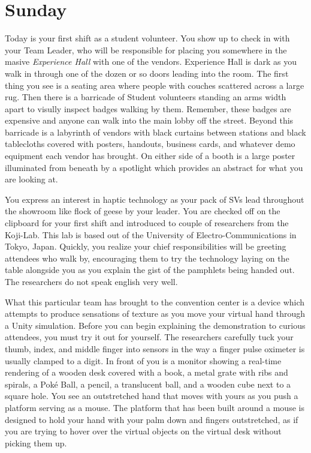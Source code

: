 \documentclass[../main.tex]{subfiles}
\begin{document}
\section{Sunday}

Today is your first shift as a student volunteer. You show up to check in with your Team Leader, who will be responsible for placing you somewhere in the masive \textit{Experience Hall} with one of the vendors. Experience Hall is dark as you walk in through one of the dozen or so doors leading into the room. The first thing you see is a seating area where people with couches scattered across a large rug. Then there is a barricade of Student volunteers standing an arms width apart to visully inspect badges walking by them. Remember, these badges are expensive and anyone can walk into the main lobby off the street. Beyond this barricade is a labyrinth of vendors with black curtains between stations and black tablecloths covered with posters, handouts, business cards, and whatever demo equipment each vendor has brought. On either side of a booth is a large poster illuminated from beneath by a spotlight which provides an abstract for what you are looking at.

You express an interest in haptic technology as your pack of SVs lead throughout the showroom like flock of geese by your leader. You are checked off on the clipboard for your first shift and introduced to couple of researchers from the Koji-Lab. This lab is based out of the University of Electro-Communications in Tokyo, Japan. Quickly, you realize your chief responsibilities will be greeting attendees who walk by, encouraging them to try the technology laying on the table alongside you as you explain the gist of the pamphlets being handed out. The researchers do not speak english very well.

What this particular team has brought to the convention center is a device which attempts to produce sensations of texture as you move your virtual hand through a Unity simulation. Before you can begin explaining the demonstration to curious attendees, you must try it out for yourself. The researchers carefully tuck your thumb, index, and middle finger into sensors in the way a finger pulse oximeter is usually clamped to a digit. In front of you is a monitor showing a real-time rendering of a wooden desk covered with a book, a metal grate with ribs and spirals, a Poké Ball, a pencil, a translucent ball, and a wooden cube next to a square hole. You see an outstretched hand that moves with yours as you push a platform serving as a mouse. The platform that has been built around a mouse is designed to hold your hand with your palm down and fingers outstretched, as if you are trying to hover over the virtual objects on the virtual desk without picking them up.
\end{document}
